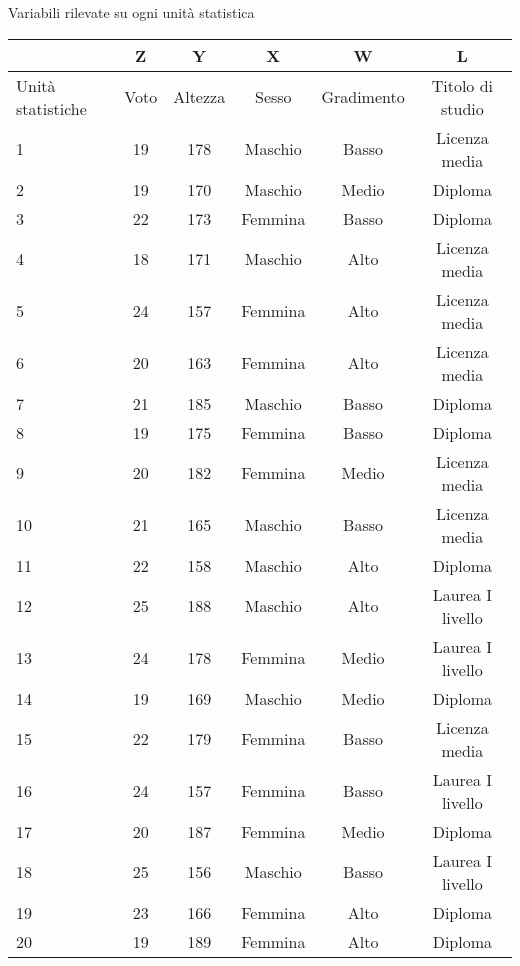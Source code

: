         Variabili rilevate su ogni unità statistica

\begin{tabular}{|p{1.5cm}|c|c|c|c|c|}
\hline
        &Z&     Y       &X      &W      &L\\
        \hline
Unità statistiche & Voto& Altezza &Sesso& Gradimento& Titolo di studio\\
\hline
         1 & 19 &     178  & Maschio& Basso & Licenza media\\
        \hline
         2 & 19 &     170  & Maschio & Medio & Diploma\\
        \hline
         3 & 22 & 173 & Femmina & Basso & Diploma\\
        \hline
         4 & 18 &    171 & Maschio & Alto & Licenza media\\
        \hline
         5 & 24 &     157 & Femmina & Alto & Licenza media\\
        \hline
         6 & 20 &163 & Femmina & Alto & Licenza media\\
        \hline
         7 & 21 &     185 & Maschio & Basso & Diploma\\
        \hline
         8 & 19 &    175 & Femmina & Basso & Diploma\\
        \hline
         9 &      20&     182 & Femmina & Medio & Licenza media\\
        \hline
        10 &     21      &165 & Maschio & Basso & Licenza media\\
        \hline
        11 &22     &158 & Maschio & Alto & Diploma\\
        \hline
        12 &25     &188 & Maschio & Alto & Laurea I livello\\
        \hline
        13 &24&    178 & Femmina & Medio & Laurea I livello\\
        \hline
        14 &19&    169 & Maschio & Medio & Diploma\\
        \hline
        15 &22&    179 & Femmina & Basso & Licenza media\\
        \hline
        16 &     24      &157 &Femmina & Basso & Laurea I livello\\
        \hline
        17 & 20      &187 & Femmina & Medio & Diploma\\
        \hline
        18 & 25 &    156 & Maschio & Basso & Laurea I livello\\
        \hline
        19 &     23&     166 & Femmina & Alto & Diploma\\
        \hline
        20 &     19      &189 & Femmina & Alto & Diploma\\
        \hline

\end{tabular}

